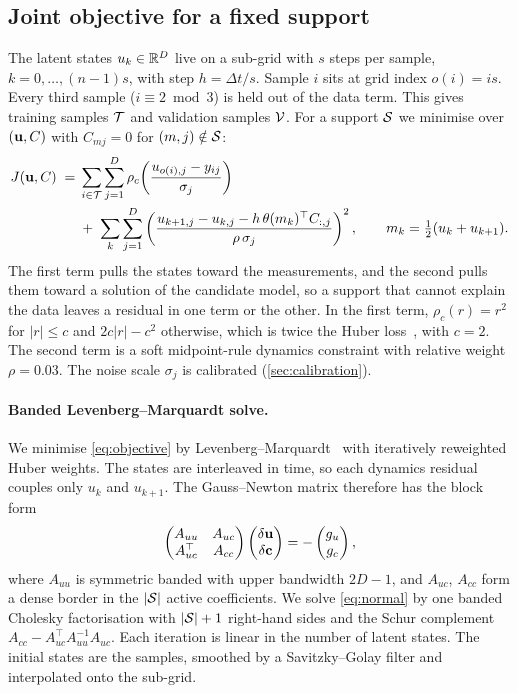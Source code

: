 \subsection{Joint objective for a fixed support}
\label{sec:objective}
The latent states $u_k\in\mathbb{R}^D$ live on a sub-grid with $s$ steps per sample, $k=0,\dots,(n-1)s$, with step $h=\Delta t/s$. Sample $i$ sits at grid index $o(i)=is$. Every third sample ($i\equiv 2 \bmod 3$) is held out of the data term. This gives training samples $\mathcal{T}$ and validation samples $\mathcal{V}$. For a support $\mathcal{S}$ we minimise over $(\mathbf{u}, C)$ with $C_{mj}=0$ for $(m,j)\notin\mathcal{S}$:
\begin{equation}
\begin{split}
J(\mathbf{u},C) \;=\;& \sum_{i\in\mathcal{T}}\sum_{j=1}^{D} \rho_c\!\left(\frac{u_{o(i),j}-y_{ij}}{\sigma_j}\right)\\
&+\; \sum_{k}\sum_{j=1}^{D}\left(\frac{u_{k+1,j}-u_{k,j}-h\,\theta(m_k)^\top C_{:,j}}{\rho\,\sigma_j}\right)^{2},
\qquad m_k=\tfrac12(u_k+u_{k+1}).
\end{split}
\label{eq:objective}
\end{equation}
The first term pulls the states toward the measurements, and the second pulls them toward a solution of the candidate model, so a support that cannot explain the data leaves a residual in one term or the other. In the first term, $\rho_c(r)=r^2$ for $|r|\le c$ and $2c|r|-c^2$ otherwise, which is twice the Huber loss~\citep{huber1964robust}, with $c=2$. The second term is a soft midpoint-rule dynamics constraint with relative weight $\rho=0.03$. The noise scale $\sigma_j$ is calibrated (\cref{sec:calibration}).

\paragraph{Banded Levenberg--Marquardt solve.}
We minimise \eqref{eq:objective} by Levenberg--Marquardt~\citep{levenberg1944,marquardt1963} with iteratively reweighted Huber weights. The states are interleaved in time, so each dynamics residual couples only $u_k$ and $u_{k+1}$. The Gauss--Newton matrix therefore has the block form
\begin{equation}
\begin{pmatrix} A_{uu} & A_{uc}\\ A_{uc}^\top & A_{cc}\end{pmatrix}
\begin{pmatrix}\delta\mathbf{u}\\ \delta\mathbf{c}\end{pmatrix} = -\begin{pmatrix} g_u\\ g_c\end{pmatrix},
\label{eq:normal}
\end{equation}
where $A_{uu}$ is symmetric banded with upper bandwidth $2D-1$, and $A_{uc}$, $A_{cc}$ form a dense border in the $|\mathcal{S}|$ active coefficients. We solve \eqref{eq:normal} by one banded Cholesky factorisation with $|\mathcal{S}|+1$ right-hand sides and the Schur complement $A_{cc}-A_{uc}^\top A_{uu}^{-1}A_{uc}$. Each iteration is linear in the number of latent states. The initial states are the samples, smoothed by a Savitzky--Golay filter and interpolated onto the sub-grid.

